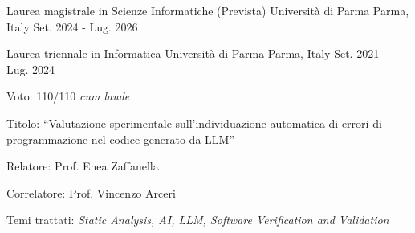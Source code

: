 

\begin{cventries}

	\cventry
		{Laurea magistrale in Scienze Informatiche (Prevista)} %
		{Università di Parma} %
		{Parma, Italy} %
		{Set. 2024 - Lug. 2026} %
		{
		}
	
  \cventry
    {Laurea triennale in Informatica} %
    {Università di Parma} %
    {Parma, Italy} %
    {Set. 2021 - Lug. 2024} %
    {
			\begin{cvitems-no-bullet} %
				\item {Voto: 110/110 \emph{cum laude}}
				\item {Titolo: \textquotedblleft{Valutazione sperimentale sull’individuazione automatica di errori di programmazione nel codice generato da LLM}\textquotedblright}
				\item {Relatore: Prof. Enea Zaffanella}
				\item {Correlatore: Prof. Vincenzo Arceri}
				\item {Temi trattati: \emph{Static Analysis, AI, LLM, Software Verification and Validation}}
      \end{cvitems-no-bullet}
    }

\end{cventries}
